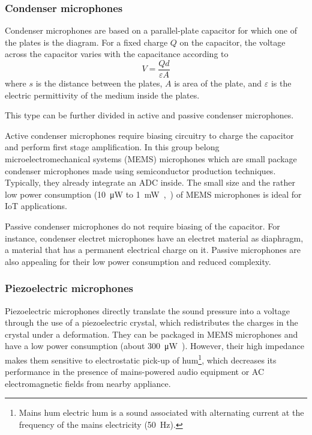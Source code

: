 \documentclass{EPL-master-thesis-covers-EN}
\begin{document}
\subsubsection*{Condenser microphones}

Condenser microphones are based on a parallel-plate capacitor for which one of the plates is the diagram. For a fixed charge $Q$ on the capacitor, the voltage across the capacitor varies with the capacitance according to
\[
V = \frac{Qd}{\varepsilon A}
\]
where $s$ is the distance between the plates, $A$ is area of the plate, and $\varepsilon$ is the electric permittivity of the medium inside the plates.

This type can be further divided in active and passive condenser microphones.

Active condenser microphones require biasing circuitry to charge the capacitor and perform first stage amplification. In this group belong microelectromechanical systems (MEMS) microphones which are small package condenser microphones made using semiconductor production techniques. Typically, they already integrate an ADC inside. The small size and the rather low power consumption (\SI{10}{\micro W} to  \SI{1}{mW}~\cite{ICS40720},~\cite{10.3390/mi9070323}) of MEMS microphones is ideal for IoT applications.
 
Passive condenser microphones do not require biasing of the capacitor. For instance, condenser electret microphones have an electret material as diaphragm, a material that has a permanent electrical charge on it. Passive microphones are also appealing for their low power consumption and reduced complexity.
 
\subsubsection*{Piezoelectric microphones}

Piezoelectric microphones directly translate the sound pressure into a voltage through the use of a piezoelectric crystal, which redistributes the charges in the crystal under a deformation. They can be packaged in MEMS microphones and have a low power consumption (about \SI{300}{\micro W}~\cite{PMM-3738-VM1000-R}). However, their high impedance makes them sensitive to electrostatic pick-up of hum\footnote{Mains hum electric hum is a sound associated with alternating current at the frequency of the mains electricity (\SI{50}{Hz}).}, which decreases its performance in the presence of mains-powered audio equipment or AC electromagnetic fields from nearby appliance.
\end{document}
